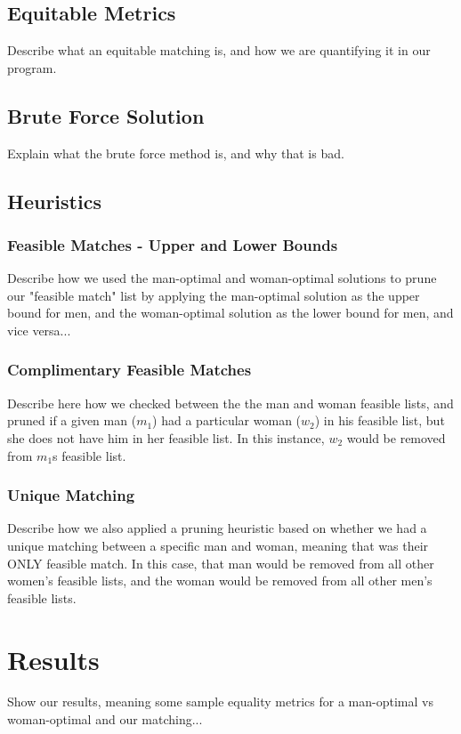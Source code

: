 \documentclass[a4paper]{article}
\begin{document}
\subsection{Equitable Metrics}
Describe what an equitable matching is, and how we are quantifying it in our program.

\subsection{Brute Force Solution}
Explain what the brute force method is, and why that is bad.

\subsection{Heuristics}
\subsubsection{Feasible Matches - Upper and Lower Bounds}
Describe how we used the man-optimal and woman-optimal solutions to prune our "feasible match" list by applying the man-optimal solution as the upper bound for men, and the woman-optimal solution as the lower bound for men, and vice versa...

\subsubsection{Complimentary Feasible Matches}
Describe here how we checked between the the man and woman feasible lists, and pruned if a given man ($m_1$) had a particular woman ($w_2$) in his feasible list, but she does not have him in her feasible list.  In this instance, $w_2$ would be removed from $m_1$s feasible list.  

\subsubsection{Unique Matching}
Describe how we also applied a pruning heuristic based on whether we had a unique matching between a specific man and woman, meaning that was their ONLY feasible match.  In this case, that man would be removed from all other women's feasible lists, and the woman would be removed from all other men's feasible lists.


\section{Results}
Show our results, meaning some sample equality metrics for a man-optimal vs woman-optimal and our matching...
\end{document}
